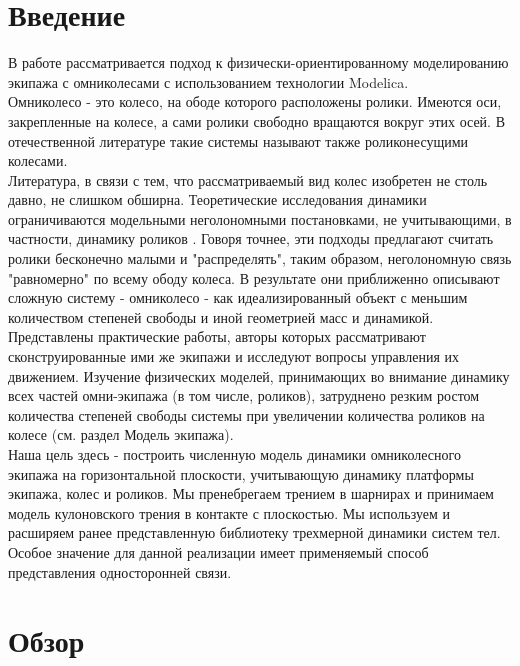 \documentclass[12pt]{article}
\begin{document}
\tableofcontents
\newpage

\section{Введение}

В работе рассматривается подход к физически-ориентированному моделированию экипажа с омниколесами с использованием технологии Modelica.\\

Омниколесо - это колесо, на ободе которого расположены ролики. Имеются оси, закрепленные на колесе, а сами ролики свободно вращаются вокруг этих осей. В отечественной литературе такие системы называют также роликонесущими колесами.\\

Литература, в связи с тем, что рассматриваемый вид колес изобретен не столь давно, не слишком обширна. Теоретические исследования динамики ограничиваются модельными неголономными постановками, не учитывающими, в частности, динамику роликов \cite{kos1,kos2,kos3,kos4}. Говоря точнее, эти подходы предлагают считать ролики бесконечно малыми и "распределять", таким образом, неголономную связь "равномерно" по всему ободу колеса. В результате они приближенно описывают сложную систему - омниколесо - как идеализированный объект с меньшим количеством степеней свободы и иной геометрией масс и динамикой. Представлены \cite{practical, particle} практические работы, авторы которых рассматривают сконструированные ими же экипажи и исследуют вопросы управления их движением. Изучение физических моделей, принимающих во внимание динамику всех частей омни-экипажа (в том числе, роликов), затруднено резким ростом количества степеней свободы системы при увеличении количества роликов на колесе (см. раздел Модель экипажа).\\

Наша цель здесь - построить численную модель динамики омниколесного экипажа на горизонтальной плоскости, учитывающую динамику платформы экипажа, колес и роликов. Мы пренебрегаем трением в шарнирах и принимаем модель кулоновского трения в контакте с плоскостью. Мы используем и расширяем ранее представленную \cite{kos5} библиотеку трехмерной динамики систем тел. Особое значение для данной реализации имеет применяемый способ представления односторонней связи.

\section{Обзор}
\end{document}
